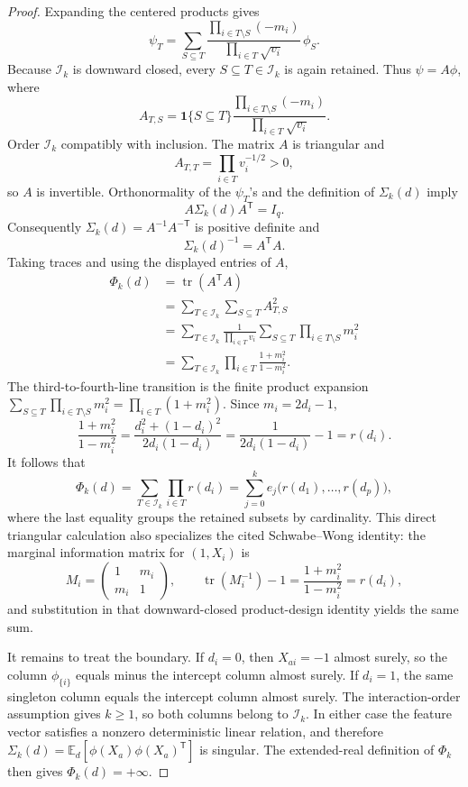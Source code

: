 \documentclass{article}
\begin{document}
\begin{proof}
Expanding the centered products gives
\[
 \psi_T
 =\sum_{S\subseteq T}
 \frac{\prod_{i\in T\setminus S}(-m_i)}
      {\prod_{i\in T}\sqrt{v_i}}\,\phi_S.
\]
Because \(\mathcal I_k\) is downward closed, every \(S\subseteq T\in\mathcal I_k\) is again retained.  Thus \(\psi=A\phi\), where
\[
 A_{T,S}=\mathbf 1\{S\subseteq T\}
 \frac{\prod_{i\in T\setminus S}(-m_i)}
      {\prod_{i\in T}\sqrt{v_i}}.
\]
Order \(\mathcal I_k\) compatibly with inclusion.  The matrix \(A\) is triangular and
\[
 A_{T,T}=\prod_{i\in T}v_i^{-1/2}>0,
\]
so \(A\) is invertible.  Orthonormality of the \(\psi_T\)'s and the definition of \(\Sigma_k(d)\) imply
\[
 A\Sigma_k(d)A^{\mathsf T}=I_q.
\]
Consequently \(\Sigma_k(d)=A^{-1}A^{-\mathsf T}\) is positive definite and
\[
 \Sigma_k(d)^{-1}=A^{\mathsf T}A.
\]
Taking traces and using the displayed entries of \(A\),
\[
\begin{aligned}
 \Phi_k(d)
 &=\operatorname{tr}(A^{\mathsf T}A)\\
 &=\sum_{T\in\mathcal I_k}\sum_{S\subseteq T}A_{T,S}^2\\
 &=\sum_{T\in\mathcal I_k}
   \frac{1}{\prod_{i\in T}v_i}
   \sum_{S\subseteq T}\prod_{i\in T\setminus S}m_i^2\\
 &=\sum_{T\in\mathcal I_k}
   \prod_{i\in T}\frac{1+m_i^2}{1-m_i^2}.
\end{aligned}
\]
The third-to-fourth-line transition is the finite product expansion
\(\sum_{S\subseteq T}\prod_{i\in T\setminus S}m_i^2
=\prod_{i\in T}(1+m_i^2)\).  Since \(m_i=2d_i-1\),
\[
 \frac{1+m_i^2}{1-m_i^2}
 =\frac{d_i^2+(1-d_i)^2}{2d_i(1-d_i)}
 =\frac{1}{2d_i(1-d_i)}-1
 =r(d_i).
\]
It follows that
\[
 \Phi_k(d)=\sum_{T\in\mathcal I_k}\prod_{i\in T}r(d_i)
 =\sum_{j=0}^{k}e_j\bigl(r(d_1),\ldots,r(d_p)\bigr),
\]
where the last equality groups the retained subsets by cardinality.  This direct triangular calculation also specializes the cited Schwabe--Wong identity: the marginal information matrix for \((1,X_i)\) is
\[
 M_i=\begin{pmatrix}1&m_i\\m_i&1\end{pmatrix},
 \qquad
 \operatorname{tr}(M_i^{-1})-1
 =\frac{1+m_i^2}{1-m_i^2}=r(d_i),
\]
and substitution in that downward-closed product-design identity yields the same sum.

It remains to treat the boundary.  If \(d_i=0\), then \(X_{ai}=-1\) almost surely, so the column \(\phi_{\{i\}}\) equals minus the intercept column almost surely.  If \(d_i=1\), the same singleton column equals the intercept column almost surely.  The interaction-order assumption gives \(k\ge1\), so both columns belong to \(\mathcal I_k\).  In either case the feature vector satisfies a nonzero deterministic linear relation, and therefore \(\Sigma_k(d)=\mathbb E_d[\phi(X_a)\phi(X_a)^{\mathsf T}]\) is singular.  The extended-real definition of \(\Phi_k\) then gives \(\Phi_k(d)=+\infty\).


\end{proof}
\end{document}

